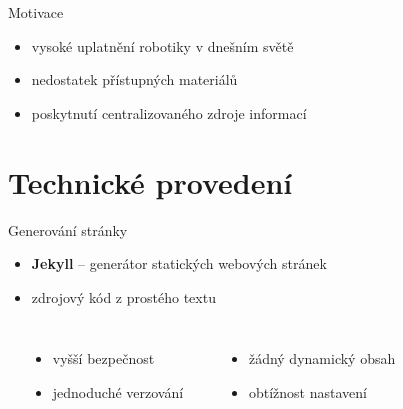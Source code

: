 \documentclass[14pt, hyperref={unicode}]{beamer}
\title{\makebox[\linewidth]{Robotika jednoduše}}
\date{\today}
\author{Tomáš Sláma}
\institute{Gymnázium Turnov}
\newcommand{\Plus}{\fixfaIcon{Plus}}
\newcommand{\Minus}{\fixfaIcon{Minus}}
\begin{document}
  \maketitle

  \begin{frame}{Motivace}
    \begin{itemize}
      \item<+-> vysoké uplatnění robotiky v dnešním světě
      \item<+-> nedostatek přístupných materiálů
      \item<+-> poskytnutí centralizovaného zdroje informací
    \end{itemize}
  \end{frame}

  \section{Technické provedení}

  \begin{frame}{Generování stránky}
    \begin{itemize}
      \item<+-> \textbf{Jekyll} -- generátor statických webových stránek
      \item<+-> zdrojový kód z prostého textu
    \end{itemize}

    \vspace{\baselineskip}

    \begin{columns}[b, onlytextwidth]
      \setlength\topsep{0pt}
      \small
        \begin{center}
          \large
          \Plus
        \end{center}
        \begin{itemize}[<+- | alert@+>]
          \itemsep0em
          \item vyšší bezpečnost
          \item jednoduché verzování
        \end{itemize}
        \begin{center}
          \large
          \Minus
        \end{center}
        \begin{itemize}[<+- | alert@+>]
          \itemsep0em
          \item žádný dynamický obsah
          \item obtížnost nastavení
        \end{itemize}
    \end{columns}
  \end{frame}
\end{document}
